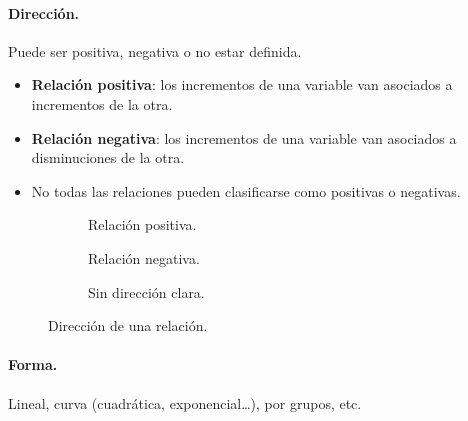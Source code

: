 \paragraph{Dirección.} Puede ser positiva, negativa o no estar definida.
\begin{itemize}
  \item \textbf{Relación positiva}: los incrementos de una variable van asociados a
    incrementos de la otra.
  \item \textbf{Relación negativa}: los incrementos de una variable van asociados a
    disminuciones de la otra.
  \item No todas las relaciones pueden clasificarse como positivas o negativas.
\end{itemize}

\begin{figure}[H]
  \centering
  \begin{subfigure}[t]{0.32\linewidth}
    \centering
    \caption{Relación positiva.}
  \end{subfigure}\hfill
  \begin{subfigure}[t]{0.32\linewidth}
    \centering
    \caption{Relación negativa.}
  \end{subfigure}\hfill
  \begin{subfigure}[t]{0.32\linewidth}
    \centering
    \caption{Sin dirección clara.}
  \end{subfigure}
  \caption{Dirección de una relación.}
\end{figure}

\paragraph{Forma.} Lineal, curva (cuadrática, exponencial\ldots), por grupos, etc.


